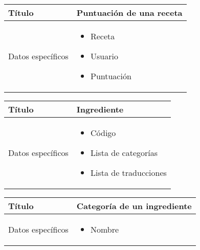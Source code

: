 \begin{center}  
  \begin{tabularx}{\textwidth}{|l|X|}
    \hline

    Título & Puntuación de una receta\\

    \hline
    Datos específicos &

    \begin{itemize}
    \item Receta
    \item Usuario
    \item Puntuación
    \end{itemize}
    \\
    
    \hline
    
  \end{tabularx}
\end{center}


\begin{center}  
  \begin{tabularx}{\textwidth}{|l|X|}
    \hline

    Título & Ingrediente\\

    \hline
    Datos específicos &

    \begin{itemize}
    \item Código
    \item Lista de categorías
    \item Lista de traducciones
    \end{itemize}
    \\

    \hline
    
  \end{tabularx}
\end{center}

\begin{center}  
  \begin{tabularx}{\textwidth}{|l|X|}
    \hline

    Título & Categoría de un ingrediente\\

    \hline
    Datos específicos &

    \begin{itemize}
    \item Nombre
    \end{itemize}
    \\
    
    \hline
    
  \end{tabularx}
\end{center}


